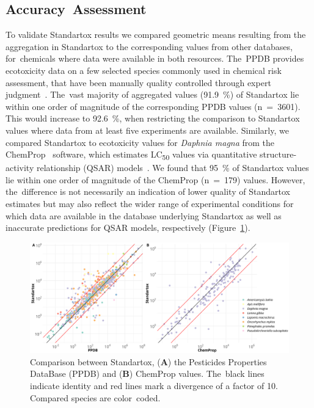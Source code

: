 \documentclass[data,datadescriptor,accept,moreauthors,pdftex]{Definitions/mdpi}
\begin{document}
\subsection{Accuracy~Assessment}
To validate Standartox results we compared geometric means resulting from the aggregation in Standartox to the corresponding values from other databases, for~chemicals where data were available in both resources. The~PPDB provides ecotoxicity data on a few selected species commonly used in chemical risk assessment, that have been manually quality controlled through expert judgment~\citep{lewis_international_2016}. The~vast majority of aggregated values (91.9~\%) of Standartox lie within one order of magnitude of the corresponding PPDB values (n~=~3601). This would increase to 92.6~\%, when restricting the comparison to Standartox values where data from at least five experiments are available. Similarly, we compared Standartox to ecotoxicity values for \textit{Daphnia magna} from the ChemProp~\citep{ufzdepartmentofecologicalchemistry_chemprop_2016} software, which estimates LC\textsubscript{50} values via quantitative structure-activity relationship (QSAR) models~\citep{schuurmann_quantitative_2011}. We found that 95~\% of Standartox values lie within one order of magnitude of the ChemProp (n~=~179) values. However, the~difference is not necessarily an indication of lower quality of Standartox estimates but may also reflect the wider range of experimental conditions for which data are available in the database underlying Standartox as well as inaccurate predictions for QSAR models, respectively (Figure~\ref{fig:standartox_ppdb_diff}).

\begin{figure}[H]
    \centering
    \includegraphics[width=.98\linewidth]{figures/gg_ppdb_stan_compare_continous.png}
    \caption{Comparison between Standartox, (\textbf{A}) the Pesticides Properties DataBase (PPDB) %
        and (\textbf{B}) ChemProp values. The~black lines indicate identity and red lines mark a divergence of a factor of 10. Compared species are color~coded.}
    \label{fig:standartox_ppdb_diff}
\end{figure}
\unskip
\end{document}
